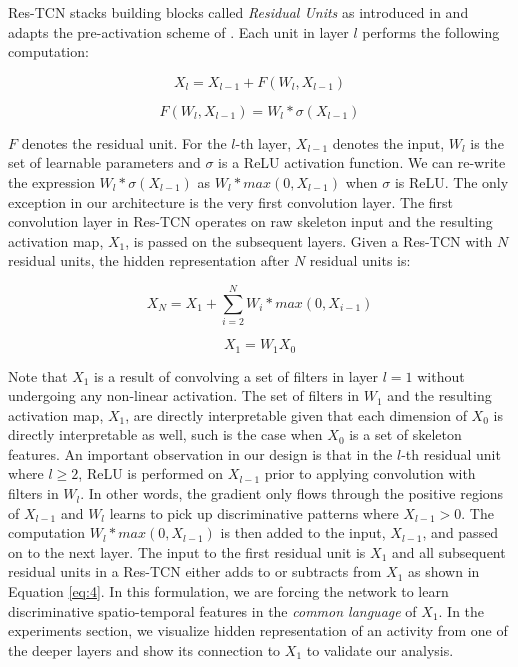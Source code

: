 \documentclass[10pt,twocolumn,letterpaper]{article}
\begin{document}
Res-TCN stacks building blocks called \textit{Residual Units} as introduced in \cite{resnet1} and adapts the pre-activation scheme of \cite{resnet}. Each unit in layer $l$ performs the following computation:

\begin{equation} \label{eq:2}
 X_{l} = X_{l-1} + F(W_l,X_{l-1})
\end{equation}

\begin{equation} \label{eq:3}
F(W_l,X_{l-1}) = W_l*\sigma(X_{l-1})
\end{equation}

$F$ denotes the residual unit. For the $l$-th layer, $X_{l-1}$ denotes the input, $W_l$ is the set of learnable parameters and $\sigma$ is a ReLU activation function. We can re-write the expression $W_l*\sigma(X_{l-1})$ as $W_l*max(0,X_{l-1})$ when $\sigma$ is ReLU. The only exception in our architecture is the very first convolution layer. The first convolution layer in Res-TCN operates on raw skeleton input and the resulting activation map, $X_1$, is passed on the subsequent layers. Given a Res-TCN with $N$ residual units, the hidden representation after $N$ residual units is:

\begin{equation} \label{eq:4}
X_N = X_1 + \sum_{i=2}^{N} W_i*max(0,X_{i-1})
\end{equation}

\begin{equation} \label{eq:5}
X_1 = W_1X_0
\end{equation}

Note that $X_1$ is a result of convolving a set of filters in layer $l=1$ without undergoing any non-linear activation. The set of filters in $W_1$ and the resulting activation map, $X_1$, are directly interpretable given that each dimension of $X_0$ is directly interpretable as well, such is the case when $X_0$ is a set of skeleton features. An important observation in our design is that in the $l$-th residual unit where $l \geq 2$, ReLU is performed on $X_{l-1}$ prior to applying convolution with filters in $W_l$. In other words, the gradient only flows through the positive regions of $X_{l-1}$ and $W_l$ learns to pick up discriminative patterns where $X_{l-1} > 0$. The computation $W_l*max(0,X_{l-1})$ is then added to the input, $X_{l-1}$, and passed on to the next layer. The input to the first residual unit is $X_1$ and all subsequent residual units in a Res-TCN either adds to or subtracts from $X_1$ as shown in Equation \ref{eq:4}. In this formulation, we are forcing the network to learn discriminative spatio-temporal features in the \textit{common language} of $X_1$. In the experiments section, we visualize hidden representation of an activity from one of the deeper layers and show its connection to $X_1$ to validate our analysis.
\end{document}
